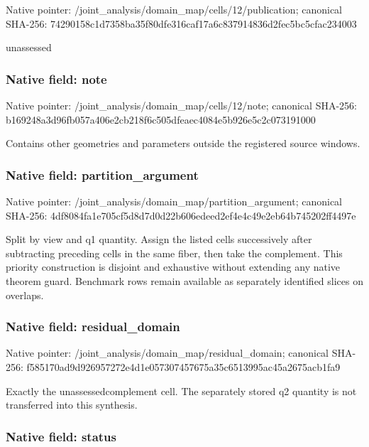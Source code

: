 \documentclass[10pt,a4paper]{article}
\begin{document}
Native pointer: /joint\_analysis/domain\_m\allowbreak{}ap/cells/12/publication; canonical SHA-256: 74290158c1d7358ba35f80df\allowbreak{}e316caf17a6c837914836d2f\allowbreak{}ec5bc5cfac234003


unassessed


\subsubsection{Native field: note}


Native pointer: /joint\_analysis/domain\_m\allowbreak{}ap/cells/12/note; canonical SHA-256: b169248a3d96fb057a406e2c\allowbreak{}b218f6c505dfeaec4084e5b9\allowbreak{}26e5c2c073191000


Contains other geometries and parameters outside the registered source windows.


\subsubsection{Native field: partition\_argument}


Native pointer: /joint\_analysis/domain\_m\allowbreak{}ap/partition\_argument; canonical SHA-256: 4df8084fa1e705cf5d8d7d0d\allowbreak{}22b606edeed2ef4e4c49e2eb\allowbreak{}64b745202ff4497e


Split by view and q1 quantity. Assign the listed cells successively after subtracting preceding cells in the same fiber, then take the complement. This priority construction is disjoint and exhaustive without extending any native theorem guard. Benchmark rows remain available as separately identified slices on overlaps.


\subsubsection{Native field: residual\_domain}


Native pointer: /joint\_analysis/domain\_m\allowbreak{}ap/residual\_domain; canonical SHA-256: f585170ad9d926957272e4d1\allowbreak{}e057307457675a35c6513995\allowbreak{}ac45a2675acb1fa9


Exactly the unassessedcomplement cell. The separately stored q2 quantity is not transferred into this synthesis.


\subsubsection{Native field: status}
\end{document}
